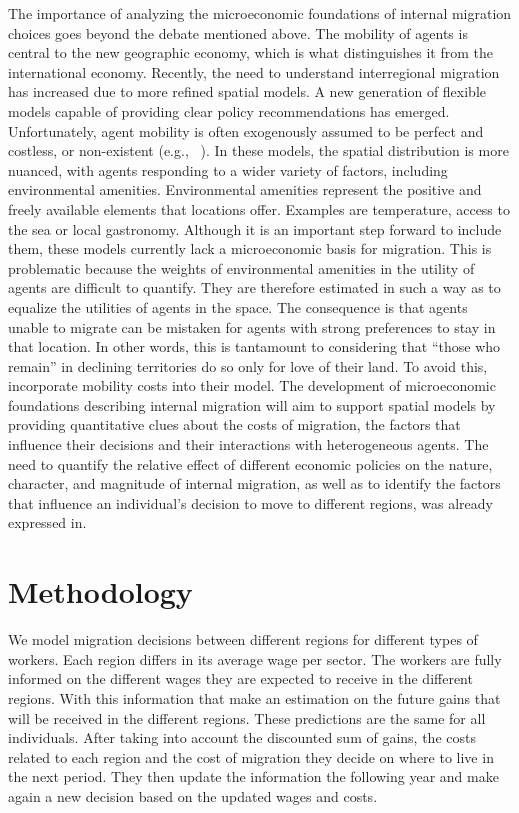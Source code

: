 \documentclass[12pt]{article}
\begin{document}
    The importance of analyzing the microeconomic foundations of internal migration choices goes beyond the debate
    mentioned above.
    The mobility of agents is central to the new geographic economy, which is what distinguishes it from the
    international economy\citep{redding2017quantitative}.
    Recently, the need to understand interregional migration has increased due to more refined spatial models.
    A new generation of flexible models capable of providing clear policy recommendations has emerged.
    Unfortunately, agent mobility is often exogenously assumed to be perfect and costless, or non-existent (e.g.,
    ~\cite{davis2012spatial}).
    In these models, the spatial distribution is more nuanced, with agents responding to a wider variety of factors,
    including environmental amenities\citep{storper2018separate}.
    Environmental amenities represent the positive and freely available elements that locations offer.
    Examples are temperature, access to the sea or local gastronomy.
    Although it is an important step forward to include them, these models currently lack a microeconomic basis for
    migration.
    This is problematic because the weights of environmental amenities in the utility of agents are difficult to
    quantify.
    They are therefore estimated in such a way as to equalize the utilities of agents in the space.
    The consequence is that agents unable to migrate can be mistaken for agents with strong preferences to stay in
    that location\citep{desmet2018geography}.
    In other words, this is tantamount to considering that ``those who remain'' in declining territories do so only for
    love of their land.
    To avoid this,~\cite{desmet2018geography} incorporate mobility costs into their model.
    The development of microeconomic foundations describing internal migration will aim to support spatial models by
    providing quantitative clues about the costs of migration, the factors that influence their decisions and their
    interactions with heterogeneous agents.
    The need to quantify the relative effect of different economic policies on the nature, character, and magnitude
    of internal migration, as well as to identify the factors that influence an individual's decision to move to
    different regions, was already expressed in\cite{todaro1976internal}.


    \section{Methodology}\label{sec:methodology}
    We model migration decisions between different regions for different types of workers.
    Each region differs in its average wage per sector.
    The workers are fully informed on the different wages they are expected to receive in the different regions.
    With this information that make an estimation on the future gains that will be received in the different regions.
    These predictions are the same for all individuals.
    After taking into account the discounted sum of gains, the costs related to each region and the cost of migration
    they decide on where to live in the next period.
    They then update the information the following year and make again a new decision based on the updated wages and
    costs.
\end{document}
